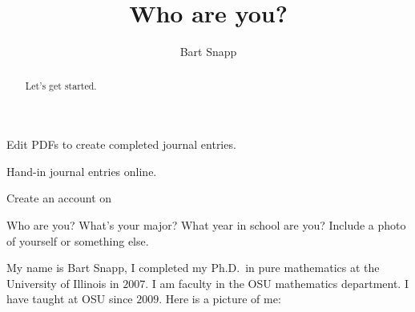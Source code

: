 \documentclass[nooutcomes,noauthor,handout]{ximera}
\title{Who are you?}
\author{Bart Snapp}
\begin{document}
\begin{abstract}
  Let's get started.
\end{abstract}
\maketitle

\begin{listOutcomes}
\item{Edit PDFs to create completed journal entries.}
\item{Hand-in journal entries online.}
\item{Create an account on \snap}
\end{listOutcomes}
\mynewpage

\begin{question}
  Who are you? What's your major? What year in school are you? Include a photo of yourself or something else.
  \begin{freeResponse}
    My name is Bart Snapp, I completed my Ph.D.\ in pure mathematics
    at the University of Illinois in $2007$.  I am faculty in the OSU
    mathematics department. I have taught at OSU since $2009$. Here is
    a picture of me:
    \begin{center}

\end{center}
\end{freeResponse}
\end{question}
\end{document}
